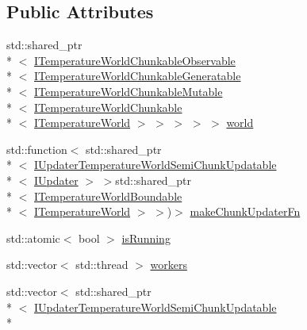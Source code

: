 \subsection*{Public Attributes}
\begin{DoxyCompactItemize}
\item 
std\-::shared\-\_\-ptr\\*
$<$ \hyperlink{class_i_temperature_world_chunkable_observable}{I\-Temperature\-World\-Chunkable\-Observable}\\*
$<$ \hyperlink{class_i_temperature_world_chunkable_generatable}{I\-Temperature\-World\-Chunkable\-Generatable}\\*
$<$ \hyperlink{class_i_temperature_world_chunkable_mutable}{I\-Temperature\-World\-Chunkable\-Mutable}\\*
$<$ \hyperlink{class_i_temperature_world_chunkable}{I\-Temperature\-World\-Chunkable}\\*
$<$ \hyperlink{class_i_temperature_world}{I\-Temperature\-World} $>$ $>$ $>$ $>$ $>$ \hyperlink{struct_threaded_chunked_temperature_world_updater_1_1_thread_data_acc751ecf3ebda6bb89a20917380453de}{world}
\item 
std\-::function$<$ std\-::shared\-\_\-ptr\\*
$<$ \hyperlink{class_i_updater_temperature_world_semi_chunk_updatable}{I\-Updater\-Temperature\-World\-Semi\-Chunk\-Updatable}\\*
$<$ \hyperlink{class_i_updater}{I\-Updater} $>$ $>$std\-::shared\-\_\-ptr\\*
$<$ \hyperlink{class_i_temperature_world_boundable}{I\-Temperature\-World\-Boundable}\\*
$<$ \hyperlink{class_i_temperature_world}{I\-Temperature\-World} $>$ $>$)$>$ \hyperlink{struct_threaded_chunked_temperature_world_updater_1_1_thread_data_aa7026a20143b64b1b98030ea715f39d7}{make\-Chunk\-Updater\-Fn}
\item 
std\-::atomic$<$ bool $>$ \hyperlink{struct_threaded_chunked_temperature_world_updater_1_1_thread_data_a1c567a74e2d30e04a7b904697f5bc32d}{is\-Running}
\item 
std\-::vector$<$ std\-::thread $>$ \hyperlink{struct_threaded_chunked_temperature_world_updater_1_1_thread_data_a9007df155da319c2c0d22950a32151e1}{workers}
\item 
std\-::vector$<$ std\-::shared\-\_\-ptr\\*
$<$ \hyperlink{class_i_updater_temperature_world_semi_chunk_updatable}{I\-Updater\-Temperature\-World\-Semi\-Chunk\-Updatable}\\*

\end{DoxyCompactItemize}
